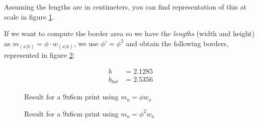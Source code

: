 \documentclass[
    paper=letter,
    parskip=half-,
    DIV=10,
]{scrreprt}
\begin{document}
Assuming the lengths are in centimeters, you can find representation of this at scale in figure \ref{fig:phi}.

If we want to compute the border area so we have the \emph{lengths} (width and height) as $m_{(x|h)} = \phi\cdot w_{(x|h)}$, we use $\phi' = \phi^2$ and obtain the following borders, represented in figure \ref{fig:phisquare}:

\begin{align*}
    b &= 2.1285 \\
    b_{bot} &= 2.5356
\end{align*}

    \begin{figure}
    \caption{Result for a 9x6cm print using $m_a = \phi w_a$}\label{fig:phi}
    \centering
{}
    \end{figure}


    \begin{figure}
    \caption{Result for a 9x6cm print using $m_a = \phi^2 w_a$}\label{fig:phisquare}
    \centering
{}
    \end{figure}
\end{document}
